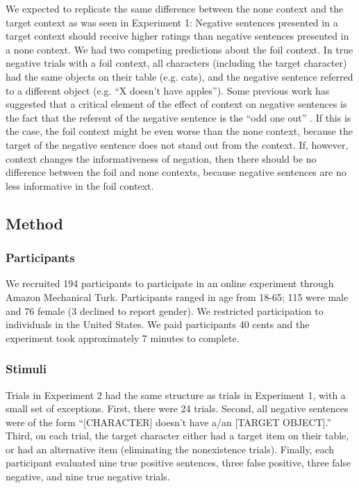 \documentclass[10pt,letterpaper]{article}
\begin{document}
We expected to replicate the same difference between the none context and the target context as was seen in Experiment 1: Negative sentences presented in a target context should receive higher ratings than negative sentences presented in a none context.  We had two competing predictions about the foil context.
In true negative trials with a foil context, all characters (including the target character) had the same objects on their table (e.g. cats), and the negative sentence referred to a different object (e.g. ``X doesn't have apples'').  Some previous work has suggested that a critical element of the effect of context on negative sentences is the fact that the referent of the negative sentence is the ``odd one out'' \cite{wason1965}.  If this is the case, the foil context might be even worse than the none context, because the target of the negative sentence does not stand out from the context.  If, however, context changes the informativeness of negation, then there should be no difference between the foil and none contexts, because negative sentences are no less informative in the foil context.  

\subsection{Method}

\subsubsection{Participants}

We recruited 194 participants to participate in an online experiment through Amazon Mechanical Turk.  Participants ranged in age from 18-65; 115 were male and 76 female (3 declined to report gender).  We restricted participation to individuals in the United States. We paid participants 40 cents and the experiment took approximately 7 minutes to complete.  

\subsubsection{Stimuli}

Trials in Experiment 2 had the same structure as trials in Experiment 1, with a small set of exceptions. First, there were 24 trials. Second, all negative sentences were of the form ``[CHARACTER] doesn't have a/an [TARGET OBJECT].'' Third, on each trial, the target character either had a target item on their table, or had an alternative item (eliminating the nonexistence trials).  Finally, each participant evaluated nine true positive sentences, three false positive, three false negative, and nine true negative trials.
\end{document}
